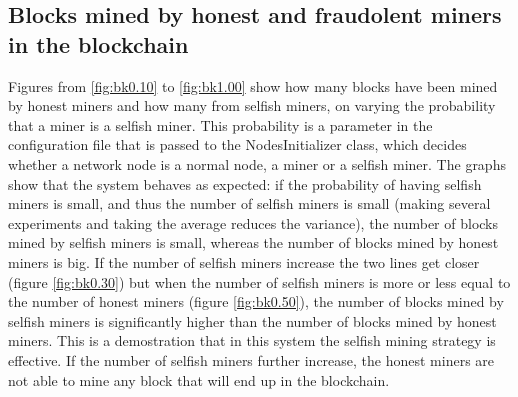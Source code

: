 \documentclass{article}
\begin{document}
\subsection{Blocks mined by honest and fraudolent miners in the blockchain} 
Figures from \ref{fig:bk0.10} to \ref{fig:bk1.00} show how many blocks have been mined by honest miners and how many from selfish miners, on varying the probability that a miner is a selfish miner. This probability is a parameter in the configuration file that is passed to the NodesInitializer class, which decides whether a network node is a normal node, a miner or a selfish miner. The graphs show that the system behaves as expected: if the probability of having selfish miners is small, and thus the number of selfish miners is small (making several experiments and taking the average reduces the variance), the number of blocks mined by selfish miners is small, whereas the number of blocks mined by honest miners is big. If the number of selfish miners increase the two lines get closer (figure \ref{fig:bk0.30}) but when the number of selfish miners is more or less equal to the number of honest miners (figure \ref{fig:bk0.50}), the number of blocks mined by selfish miners is significantly higher than the number of blocks mined by honest miners. This is a demostration that in this system the selfish mining strategy is effective. If the number of selfish miners further increase, the honest miners are not able to mine any block that will end up in the blockchain.
\end{document}
